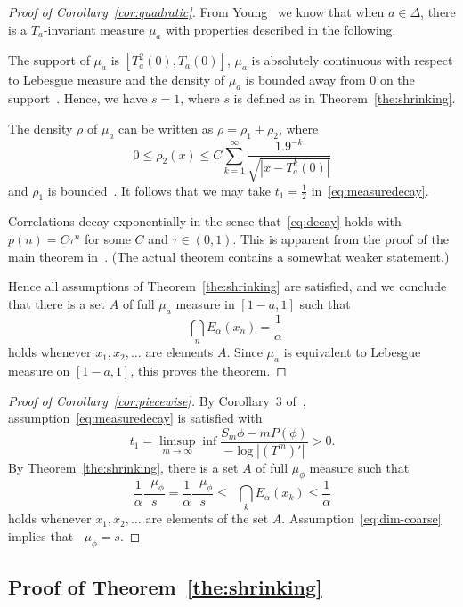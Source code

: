 \documentclass[11pt]{article}
\theoremstyle{definition}
\numberwithin{equation}{section}
\numberwithin{figure}{section}
\numberwithin{table}{section}
\DeclareMathOperator{\dimh}{dim_H}
\DeclareMathOperator{\udimh}{\overline{dim}_H}
\begin{document}
\begin{proof}[Proof of Corollary~\ref{cor:quadratic}]
From Young~\cite{young} we know that when $a \in \Delta$, there is a $T_a$-invariant measure $\mu_a$ with properties described in the following.

The support of $\mu_a$ is $[T_a^2 (0), T_a (0)]$, $\mu_a$ is absolutely continuous with respect to Lebesgue measure and the density of $\mu_a$ is bounded away from $0$ on the support~\cite[Theorem~2]{young}. Hence, we have $s=1$, where $s$ is defined as in Theorem~\ref{the:shrinking}.

The density $\rho$ of $\mu_a$ can be written as $\rho = \rho_1 +
\rho_2$, where
\[
0 \leq \rho_2 (x) \leq C \sum_{k=1}^\infty \frac{1.9^{-k}}{\sqrt{|x - T_a^k (0)|}}
\]
and $\rho_1$ is bounded~\cite[Theorem~1]{young}. It follows that we may take $t_1 = \frac{1}{2}$ in~\eqref{eq:measuredecay}.

Correlations decay exponentially in the sense that~\eqref{eq:decay} holds with $p(n) = C \tau^n$ for some $C$ and $\tau \in (0,1)$. This is apparent from the proof of the main theorem in~\cite{young}. (The actual theorem contains a somewhat weaker statement.)

Hence all assumptions of Theorem~\ref{the:shrinking} are satisfied, and we conclude that there is a set $A$ of full $\mu_a$ measure in $[1-a,1]$ such that
\[
\dimh \bigcap_n E_\alpha (x_n) = \frac{1}{\alpha}
\]
holds whenever $x_1, x_2, \ldots$ are elements $A$. Since $\mu_a$ is equivalent to Lebesgue measure on $[1-a,1]$, this proves the theorem.
\end{proof}

\begin{proof}[Proof of Corollary~\ref{cor:piecewise}]
By Corollary~3 of~\cite{perssonrams}, assumption~\eqref{eq:measuredecay} is satisfied with
\[
t_1 = \limsup_{m\to \infty} \inf \frac{S_m \phi - m P(\phi)}{- \log |(T^m)'|} > 0.
\]
By Theorem~\ref{the:shrinking}, there is a set $A$ of full $\mu_\phi$ measure such that
\[
\frac{1}{\alpha} \frac{\dimh \mu_\phi}{s} = \frac{1}{\alpha}
\frac{\udimh \mu_\phi}{s} \leq \dimh \bigcap_k E_\alpha (x_k) \leq
\frac{1}{\alpha}
\]
holds whenever $x_1, x_2, \ldots$ are elements of the set $A$. Assumption~\eqref{eq:dim-coarse} implies that $\dimh \mu_\phi = s$.
\end{proof}


\subsection{Proof of Theorem~\ref{the:shrinking}}
\end{document}
